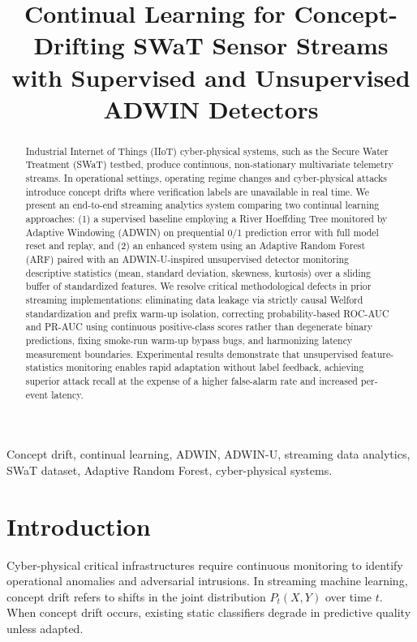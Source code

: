 \documentclass[conference]{IEEEtran}
\title{Continual Learning for Concept-Drifting SWaT Sensor Streams with Supervised and Unsupervised ADWIN Detectors}
\author{\IEEEauthorblockN{Academic Project Report}
\IEEEauthorblockA{Course: IOE413 --- Streaming Data Analytics (Topic 10, Track B)\\
Department of Industrial and Operations Engineering}}
\begin{document}
\maketitle

\begin{abstract}
Industrial Internet of Things (IIoT) cyber-physical systems, such as the Secure Water Treatment (SWaT) testbed, produce continuous, non-stationary multivariate telemetry streams. In operational settings, operating regime changes and cyber-physical attacks introduce concept drifts where verification labels are unavailable in real time. We present an end-to-end streaming analytics system comparing two continual learning approaches: (1) a supervised baseline employing a River Hoeffding Tree monitored by Adaptive Windowing (ADWIN) on prequential 0/1 prediction error with full model reset and replay, and (2) an enhanced system using an Adaptive Random Forest (ARF) paired with an ADWIN-U-inspired unsupervised detector monitoring descriptive statistics (mean, standard deviation, skewness, kurtosis) over a sliding buffer of standardized features. We resolve critical methodological defects in prior streaming implementations: eliminating data leakage via strictly causal Welford standardization and prefix warm-up isolation, correcting probability-based ROC-AUC and PR-AUC using continuous positive-class scores rather than degenerate binary predictions, fixing smoke-run warm-up bypass bugs, and harmonizing latency measurement boundaries. Experimental results demonstrate that unsupervised feature-statistics monitoring enables rapid adaptation without label feedback, achieving superior attack recall at the expense of a higher false-alarm rate and increased per-event latency.
\end{abstract}

\begin{IEEEkeywords}
Concept drift, continual learning, ADWIN, ADWIN-U, streaming data analytics, SWaT dataset, Adaptive Random Forest, cyber-physical systems.
\end{IEEEkeywords}

\section{Introduction}
Cyber-physical critical infrastructures require continuous monitoring to identify operational anomalies and adversarial intrusions. In streaming machine learning, concept drift refers to shifts in the joint distribution $P_t(X, Y)$ over time $t$. When concept drift occurs, existing static classifiers degrade in predictive quality unless adapted.
\end{document}
